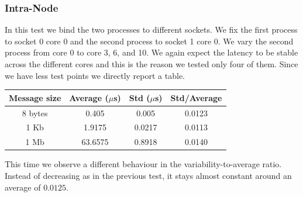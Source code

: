 \subsubsection{Intra-Node}
    In this test we bind the two processes to different sockets. We fix
    the first process to socket 0 core 0 and the second process to socket
    1 core 0. We vary the second process from core 0 to core 3, 6, and 10.
    We again expect the latency to be stable across the different cores and
    this is the reason we tested only four of them. Since we have less test
    points we directly report a table.
    \begin{table}[H]
        \centering
        \begin{tabular}{|c|c|c|c|}
            \hline
            \textbf{Message size} & \textbf{Average ($\mu$s)} & \textbf{Std ($\mu$s)} & \textbf{Std/Average} \\
            \hline
            8 bytes & 0.405 & 0.005 & 0.0123 \\
            1 Kb & 1.9175 & 0.0217 & 0.0113 \\
            1 Mb & 63.6575 & 0.8918 & 0.0140 \\
            \hline
        \end{tabular}
    \end{table}
    This time we observe a different behaviour in the variability-to-average
    ratio. Instead of decreasing as in the previous test, it stays almost
    constant around an average of $0.0125$.

